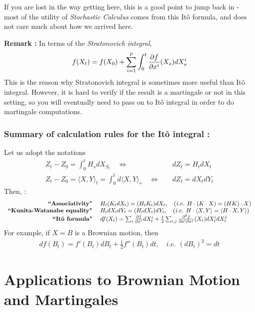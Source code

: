 \documentclass[12pt,a4paper]{article}
\begin{document}
If you are lost in the way getting here, this is a good point to jump back in - most of the utility of \emph{Stochastic Calculus} comes from this It\^o formula, and does not care much about how we arrived here.
\s

\textbf{Remark :} In terms of the \emph{Stratonovich integral},
\begin{align*}
f(X_t) = f(X_0) + \sum_{i=1}^p \int_0^t \frac{\partial f}{\partial x^i} (X_s) dX_s^i
\end{align*}
This is the reason why Stratonovich integral is sometimes more useful than It\^o integral. However, it is hard to verify if the result is a martingale or not in this setting, so you will eventually need to pass on to It\^o integral in order to do martingale computations.
\s

\subsubsection*{Summary of calculation rules for the It\^o integral :}

Let us adopt the notations
\begin{align*}
Z_t - Z_0 = \int_0^t H_s dX_{S_t} \quad \Leftrightarrow & \quad dZ_t = H_t dX_t \\
Z_t - Z_0 = \langle X, Y\rangle_t =\int_0^t d\langle X, Y \rangle_s \quad \Leftrightarrow & \quad dZ_t = dX_t dY_t
\end{align*}
Then, :
\begin{align*}
\begin{array}{rl}
\textbf{``Associativity" }  & H_t (K_t dX_t) = (H_t K_t) dX_t, \quad (\textit{i.e. } H\cdot (K \cdot X) = (HK) \cdot X) \\
\textbf{``Kunita-Watanabe equality" } & H_t dX_t dY_t = (H_t dX_t) dY_t, \quad (\textit{i.e. } H\cdot \langle X, Y \rangle = \langle H\cdot X, Y \rangle )\\
\textbf{``It\^o formula" } & df(X_t) = \sum_{i}\frac{\partial f}{\partial x^i} dX_t^i + \frac{1}{2} \sum_{i,j} \frac{\partial^2 f}{\partial x^i \partial x^j} (X_t) dX_t^i dX_t^j
\end{array}
\end{align*}
For example, if $X= B$ is a Brownian motion, then
\begin{align*}
df(B_t) = f'(B_t) dB_t + \frac{1}{2}f''(B_t) dt, \quad \textit{i.e. } (dB_t)^2 = dt
\end{align*}

\section{Applications to Brownian Motion and Martingales}
\end{document}
